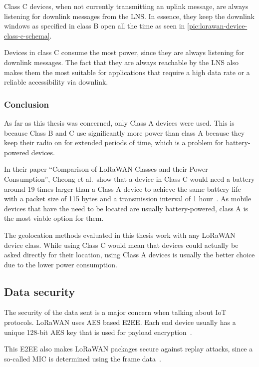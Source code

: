 Class C devices, when not currently transmitting an uplink message, are always listening for downlink messages from the \ac{LNS}.
In essence, they keep the downlink windows as specified in class B open all the time as seen in \cref{pic:lorawan-device-class-c-schema}.

Devices in class C consume the most power, since they are always listening for downlink messages.
The fact that they are always reachable by the \ac{LNS} also makes them the most suitable for applications that require a high data rate or a reliable accessibility via downlink.

\subsubsection{Conclusion}

As far as this thesis was concerned, only Class A devices were used.
This is because Class B and C use significantly more power than class A because they keep their radio on for extended periods of time, which is a problem for battery-powered devices.

In their paper ``Comparison of LoRaWAN Classes and their Power Consumption'', Cheong et al.\ show that a device in Class C would need a battery around 19 times larger than a Class A device to achieve the same battery life with a packet size of 115 bytes and a transmission interval of 1 hour~\cite{cheong_comparison_2017}.
As mobile devices that have the need to be located are usually battery-powered, class A is the most viable option for them.

The geolocation methods evaluated in this thesis work with any \ac{LoRaWAN} device class.
While using Class C would mean that devices could actually be asked directly for their location, using Class A devices is usually the better choice due to the lower power consumption.

\subsection{Data security}

The security of the data sent is a major concern when talking about \ac{IoT} protocols.
\ac{LoRaWAN} uses \ac{AES} based \acf{E2EE}.
Each end device usually has a unique 128-bit \ac{AES} key that is used for payload encryption~\cite{lora_alliance_inc_lorawan_2017-1}.

This \ac{E2EE} also makes \ac{LoRaWAN} packages secure against replay attacks, since a so-called \ac{MIC} is determined using the frame data~\cite{lora_alliance_inc_lorawan_2017-1}.

